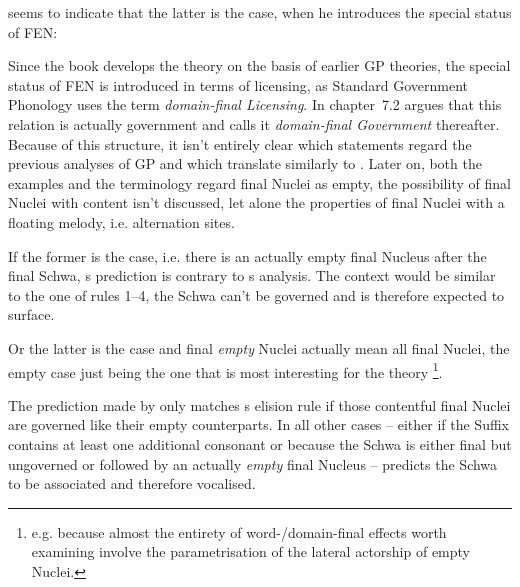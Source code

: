  seems to indicate that the latter
is the case, when he introduces the special status
of \gls{FEN}: 

Since the book develops the \CVCV theory on the basis
of earlier \gls{GP} theories, the special status of
\gls{FEN} is introduced in terms of licensing,
as Standard Government Phonology uses the term
\emph{domain-final Licensing}.
In chapter~7.2  argues
that this relation is actually government and calls
it \emph{domain-final Government} thereafter.
Because of this structure, it isn't entirely clear which
statements regard the previous analyses of \gls{GP} and
which translate similarly to \CVCV.
Later on, both the examples and the terminology regard
final Nuclei as empty, the possibility of final Nuclei
with content isn't discussed,
let alone the properties of final Nuclei with a floating
melody, i.e. alternation sites.

If the former is the case, i.e. there is an actually empty
final Nucleus after the final Schwa, \CVCV{}s prediction
is contrary to \citeauthor{issatschenko1974}s analysis.
The context would be similar to the one of rules 1--4,
the Schwa can't be governed and is therefore expected to
surface.

Or the latter is the case and final \emph{empty} Nuclei
actually mean all final Nuclei, the empty case just being
the one that is most interesting for the theory%
\footnote{e.g. because almost the entirety of
  word-/domain-final effects worth examining involve the
  parametrisation of the lateral actorship of empty Nuclei.}.

The prediction made by \CVCV only matches
s elision rule if those
contentful final Nuclei are governed like their
empty counterparts. In all other cases -- either if
the Suffix contains at least one additional consonant or
because the Schwa is either final but ungoverned or followed
by an actually \emph{empty} final Nucleus --
\CVCV{} predicts the Schwa to be associated and therefore
vocalised.

\noindent{}


